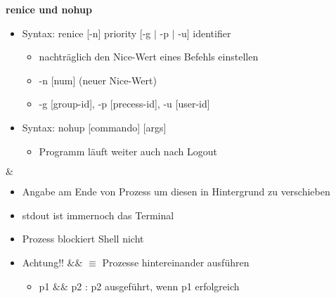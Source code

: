 \documentclass{article}
\begin{document}
\textbf{renice und nohup}
\begin{itemize}
	\item Syntax: renice [-n] priority [-g $\mid$ -p $\mid$ -u] identifier
	\begin{itemize}
		\item nachträglich den Nice-Wert eines Befehls einstellen
		\item -n [num] (neuer Nice-Wert)
		\item -g [group-id], -p [precess-id], -u [user-id]
	\end{itemize}
	\item Syntax: nohup [commando] [args]
	\begin{itemize}
		\item Programm läuft weiter auch nach Logout
	\end{itemize}
\end{itemize}

\textbf{$\&$}
\begin{itemize}
	\item Angabe am Ende von Prozess um diesen in Hintergrund zu verschieben
	\item stdout ist immernoch das Terminal
	\item Prozess blockiert Shell nicht
	\item Achtung!! $\&\&$ $\equiv$ Prozesse hintereinander ausführen
	\begin{itemize}
		\item p1 $\&\&$ p2 : p2 ausgeführt, wenn p1 erfolgreich
	\end{itemize}
\end{itemize}
\end{document}

